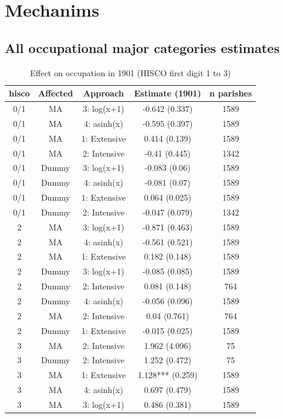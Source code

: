 \section{Mechanims}

\FloatBarrier
\subsection{All occupational major categories estimates} 
\begin{table}[]
    \centering
    \caption{\label{tab:occ1} Effect on occupation in 1901 (HISCO first digit 1 to 3)}
    \footnotesize
    \begin{tabular}{ccccc}
\toprule
hisco & Affected & Approach & Estimate (1901) & n parishes\\
\midrule
0/1 & MA & 3: log(x+1) & -0.642 (0.337) & 1589\\
0/1 & MA & 4: asinh(x) & -0.595 (0.397) & 1589\\
0/1 & MA & 1: Extensive & 0.414 (0.139) & 1589\\
0/1 & MA & 2: Intensive & -0.41 (0.445) & 1342\\
0/1 & Dummy & 3: log(x+1) & -0.083 (0.06) & 1589\\
0/1 & Dummy & 4: asinh(x) & -0.081 (0.07) & 1589\\
0/1 & Dummy & 1: Extensive & 0.064 (0.025) & 1589\\
0/1 & Dummy & 2: Intensive & -0.047 (0.079) & 1342\\
2 & MA & 3: log(x+1) & -0.871 (0.463) & 1589\\
2 & MA & 4: asinh(x) & -0.561 (0.521) & 1589\\
2 & MA & 1: Extensive & 0.182 (0.148) & 1589\\
2 & Dummy & 3: log(x+1) & -0.085 (0.085) & 1589\\
2 & Dummy & 2: Intensive & 0.081 (0.148) & 764\\
2 & Dummy & 4: asinh(x) & -0.056 (0.096) & 1589\\
2 & MA & 2: Intensive & 0.04 (0.761) & 764\\
2 & Dummy & 1: Extensive & -0.015 (0.025) & 1589\\
3 & MA & 2: Intensive & 1.962 (4.096) & 75\\
3 & Dummy & 2: Intensive & 1.252 (0.472) & 75\\
3 & MA & 1: Extensive & 1.128*** (0.259) & 1589\\
3 & MA & 4: asinh(x) & 0.697 (0.479) & 1589\\
3 & MA & 3: log(x+1) & 0.486 (0.381) & 1589\\

\end{tabular}
\end{table}
